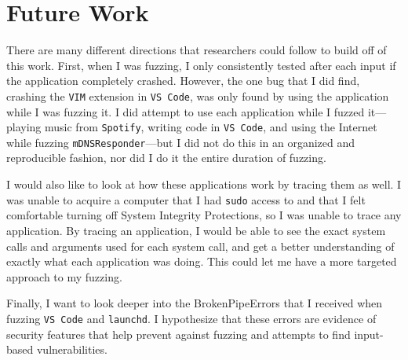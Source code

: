 \chapter{Future Work}
\label{sec:futureWork}
There are many different directions that researchers could follow to build off of this work.  First, when I was fuzzing, I only consistently tested after each input if the application completely crashed.  However, the one bug that I did find, crashing the \texttt{VIM} extension in \texttt{VS Code}, was only found by using the application while I was fuzzing it.  I did attempt to use each application while I fuzzed it---playing music from \texttt{Spotify}, writing code in \texttt{VS Code}, and using the Internet while fuzzing \texttt{mDNSResponder}---but I did not do this in an organized and reproducible fashion, nor did I do it the entire duration of fuzzing.

I would also like to look at how these applications work by tracing them as well.  I was unable to acquire a computer that I had \texttt{sudo} access to and that I felt comfortable turning off System Integrity Protections, so I was unable to trace any application.  By tracing an application, I would be able to see the exact system calls and arguments used for each system call, and get a better understanding of exactly what each application was doing.  This could let me have a more targeted approach to my fuzzing.

Finally, I want to look deeper into the BrokenPipeErrors that I received when fuzzing \texttt{VS Code} and \texttt{launchd}.  I hypothesize that these errors are evidence of security features that help prevent against fuzzing and attempts to find input-based vulnerabilities.
